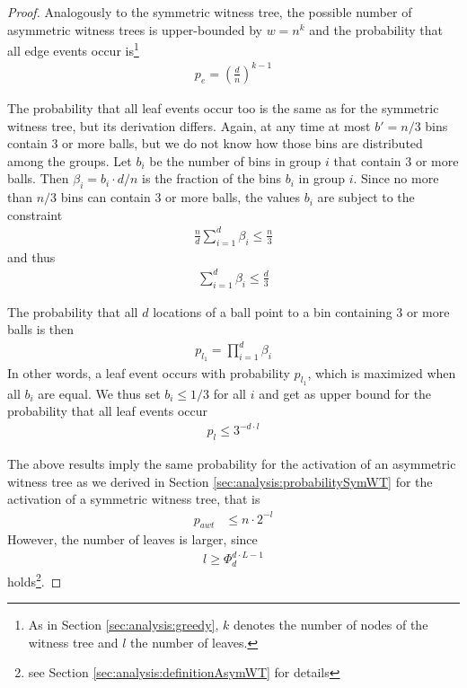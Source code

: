 \documentclass[a4paper,12pt]{article}
\begin{document}
\begin{proof}
Analogously to the symmetric witness tree, the possible number of asymmetric witness trees is upper-bounded by $w=n^k$ and the probability that all edge events occur is\footnote{As in Section \ref{sec:analysis:greedy}, $k$ denotes the number of nodes of the witness tree and $l$ the number of leaves.} 
\begin{align*}
p_e = \left(\frac{d}{n}\right)^{k-1}
\end{align*}

The probability that all leaf events occur too is the same as for the symmetric witness tree, but its derivation differs. Again, at any time at most $b'=n/3$ bins contain 3 or more balls, but we do not know how those bins are distributed among the groups. Let $b_i$ be the number of bins in group $i$ that contain 3 or more balls. Then $\beta_i = b_i\cdot d/ n$ is the fraction of the bins $b_i$ in group $i$. Since no more than $n/3$ bins can contain 3 or more balls, the values $b_i$ are subject to the constraint
\begin{align*}
\frac{n}{d}\sum_{i=1}^d \beta_i \leq \frac{n}{3}
\end{align*}
and thus 
\begin{align*}
\sum_{i=1}^d \beta_i \leq \frac{d}{3}
\end{align*}

The probability that all $d$ locations of a ball point to a bin containing 3 or more balls is then 
\begin{align*}
p_{l_1} = \prod_{i=1}^{d} \beta_i
\end{align*}
In other words, a leaf event occurs with probability $p_{l_1}$, which is maximized when all $b_i$ are equal. We thus set $b_i \leq 1/3$ for all $i$ and get as upper bound for the probability that all leaf events occur 
\begin{align*}
p_l \leq 3^{-d\cdot l}
\end{align*}

The above results imply the same probability for the activation of an asymmetric witness tree as we derived in Section \ref{sec:analysis:probabilitySymWT} for the activation of a symmetric witness tree, that is
\begin{align*}
p_{awt} &\leq n \cdot 2^{-l}
\end{align*}
However, the number of leaves is larger, since 
\begin{align*}
l \geq \Phi_d^{d\cdot L -1}
\end{align*}
holds\footnote{see Section \ref{sec:analysis:definitionAsymWT} for details}.


\end{proof}
\end{document}
